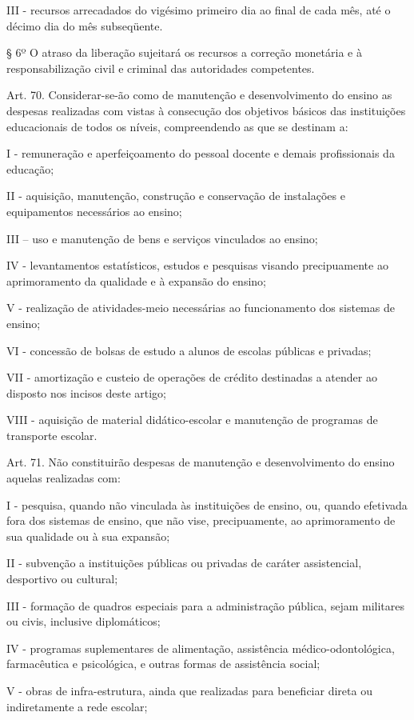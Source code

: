 \documentclass[
]{book}
\begin{document}
III - recursos arrecadados do vigésimo primeiro dia ao final de cada mês, até o décimo dia do mês subseqüente.

§ 6º O atraso da liberação sujeitará os recursos a correção monetária e à responsabilização civil e criminal das autoridades competentes.

Art. 70. Considerar-se-ão como de manutenção e desenvolvimento do ensino as despesas realizadas com vistas à consecução dos objetivos básicos das instituições educacionais de todos os níveis, compreendendo as que se destinam a:

I - remuneração e aperfeiçoamento do pessoal docente e demais profissionais da educação;

II - aquisição, manutenção, construção e conservação de instalações e equipamentos necessários ao ensino;

III -- uso e manutenção de bens e serviços vinculados ao ensino;

IV - levantamentos estatísticos, estudos e pesquisas visando precipuamente ao aprimoramento da qualidade e à expansão do ensino;

V - realização de atividades-meio necessárias ao funcionamento dos sistemas de ensino;

VI - concessão de bolsas de estudo a alunos de escolas públicas e privadas;

VII - amortização e custeio de operações de crédito destinadas a atender ao disposto nos incisos deste artigo;

VIII - aquisição de material didático-escolar e manutenção de programas de transporte escolar.

Art. 71. Não constituirão despesas de manutenção e desenvolvimento do ensino aquelas realizadas com:

I - pesquisa, quando não vinculada às instituições de ensino, ou, quando efetivada fora dos sistemas de ensino, que não vise, precipuamente, ao aprimoramento de sua qualidade ou à sua expansão;

II - subvenção a instituições públicas ou privadas de caráter assistencial, desportivo ou cultural;

III - formação de quadros especiais para a administração pública, sejam militares ou civis, inclusive diplomáticos;

IV - programas suplementares de alimentação, assistência médico-odontológica, farmacêutica e psicológica, e outras formas de assistência social;

V - obras de infra-estrutura, ainda que realizadas para beneficiar direta ou indiretamente a rede escolar;
\end{document}
